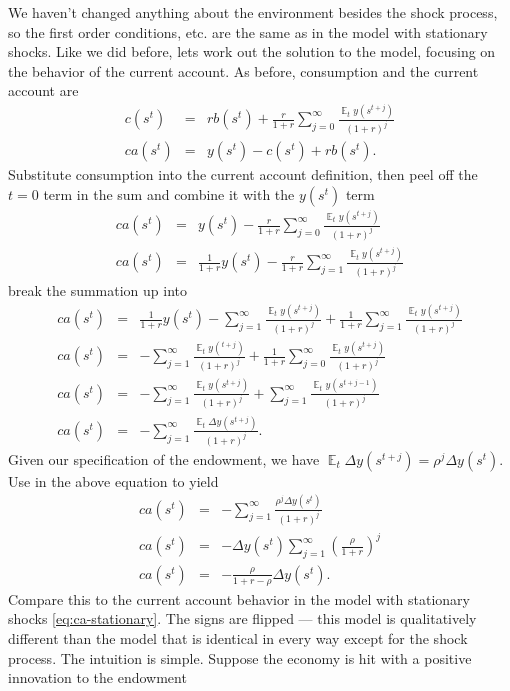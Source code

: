 \documentclass[11pt,pdftex,twoside,letterpaper]{exam}
\DeclareMathOperator{\EX}{\mathbb{E}}%
\begin{document}
We haven't changed anything about the environment besides the shock process, so the first order conditions, etc. are the same as in the model with stationary shocks. Like we did before, lets work out the solution to the model, focusing on the behavior of the current account. As before, consumption  and the current account are
\begin{eqnarray}
  c(s^t) &=& rb(s^t) + \frac{r}{1+r}\sum_{j=0}^\infty\frac{\EX_ty(s^{t+j})}{(1+r)^j}\\
  ca(s^t) &=& y(s^t)-c(s^t)+rb(s^t).
\end{eqnarray}
Substitute consumption into the current account definition, then peel off the $t=0$ term in the sum and combine it with the $y(s^t)$ term
\begin{eqnarray}
  ca(s^t) &=& y(s^t) - \frac{r}{1+r}\sum_{j=0}^\infty\frac{\EX_ty(s^{t+j})}{(1+r)^j} \\
  ca(s^t) &=& \frac{1}{1+r}y(s^t) - \frac{r}{1+r}\sum_{j=1}^\infty\frac{\EX_ty(s^{t+j})}{(1+r)^j}
\end{eqnarray}
break the summation up into
\begin{eqnarray}
  ca(s^t) &=& \frac{1}{1+r}y(s^t) - \sum_{j=1}^\infty\frac{\EX_ty(s^{t+j})}{(1+r)^j}+ \frac{1}{1+r}\sum_{j=1}^\infty\frac{\EX_ty(s^{t+j})}{(1+r)^j}\\
  ca(s^t) &=& - \sum_{j=1}^\infty\frac{\EX_ty(^{t+j})}{(1+r)^j}+ \frac{1}{1+r}\sum_{j=0}^\infty\frac{\EX_ty(s^{t+j})}{(1+r)^j}\\
  ca(s^t) &=& - \sum_{j=1}^\infty\frac{\EX_ty(s^{t+j})}{(1+r)^j}+ \sum_{j=1}^\infty\frac{\EX_ty(s^{t+j-1})}{(1+r)^j}\\
  ca(s^t) &=& - \sum_{j=1}^\infty\frac{\EX_t \Delta y(s^{t+j})}{(1+r)^j}.
\end{eqnarray}
Given our specification of the endowment, we have $\EX_t\Delta y(s^{t+j})=\rho^j\Delta y(s^t)$. Use in the above equation to yield
\begin{eqnarray}
  ca(s^t) &=& - \sum_{j=1}^\infty\frac{\rho^j \Delta y(s^t)}{(1+r)^j}\\
  ca(s^t) &=& - \Delta y(s^t)\sum_{j=1}^\infty\left(\frac{\rho }{1+r}\right)^j\\
  ca(s^t) &=& - \frac{\rho }{1+r-\rho}\Delta y(s^t).
\end{eqnarray}
Compare this to the current account behavior in the model with stationary shocks \eqref{eq:ca-stationary}. The signs are flipped --- this model is qualitatively different than the model that is identical in every way except for the shock process. The intuition is simple. Suppose the economy is hit with a positive innovation to the endowment
\end{document}

